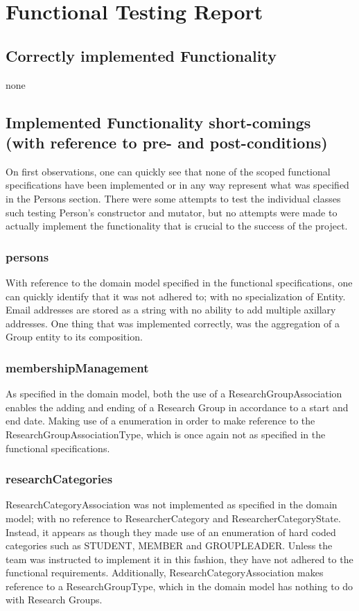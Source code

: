 \documentclass{article}
\begin{document}
\newpage

\section{Functional Testing Report}

	\subsection{Correctly implemented Functionality}
	
	none

    \subsection{Implemented Functionality short-comings (with reference to pre- and post-conditions)}
    
    	On first observations, one can quickly see that none of the scoped functional specifications have been implemented or in any way represent what was specified in the Persons section. There were some attempts to test the individual classes such testing Person's constructor and mutator, but no attempts were made to actually implement the functionality that is crucial to the success of the project.
	
		\subsubsection{persons}
		With reference to the domain model specified in the functional specifications, one can quickly identify that it was not adhered to; with no specialization of Entity. Email addresses are stored as a string with no ability to add multiple axillary addresses. One thing that was implemented correctly, was the aggregation of a Group entity to its composition.

		\subsubsection{membershipManagement}
		As specified in the domain model, both the use of a ResearchGroupAssociation enables the adding and ending of a Research Group in accordance to a start and end date. Making use of a enumeration in order to make reference to the ResearchGroupAssociationType, which is once again not as specified in the functional specifications. 

		\subsubsection{researchCategories}
		ResearchCategoryAssociation was not implemented as specified in the domain model; with no reference to ResearcherCategory and ResearcherCategoryState. Instead, it appears as though they made use of an enumeration of hard coded categories such as STUDENT, MEMBER and GROUPLEADER. Unless the team was instructed to implement it in this fashion, they have not adhered to the functional requirements. Additionally, ResearchCategoryAssociation makes reference to a ResearchGroupType, which in the domain model has nothing to do with Research Groups.
\end{document}
